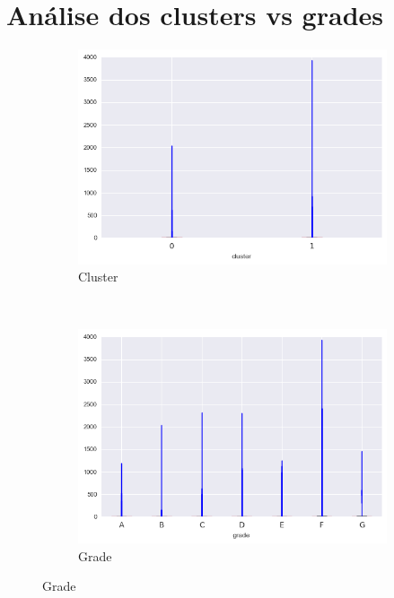 \begin{apendicesenv}
\begin{tabularx}{\textwidth}{p{}X}
\bottomrule

\end{tabularx}

\chapter{Análise dos clusters vs grades}

\begin{figure}[t!]
    \centering
        \caption{collection\textunderscore recovery\textunderscore fee }
    	\begin{subfigure}[t]{0.5\textwidth}
    		\centering
        	\caption{Cluster }

			\centerline{\includegraphics[width=1\textwidth]{img/collection_recovery_fee_by_cluster}}
    	\end{subfigure}%
    	~ 
    	\begin{subfigure}[t]{0.5\textwidth}
    		\centering
        	\caption{Grade }
   
			\centerline{\includegraphics[width=1\textwidth]{img/collection_recovery_fee_by_grade}}


\end{subfigure}
\end{figure}
\end{apendicesenv}
